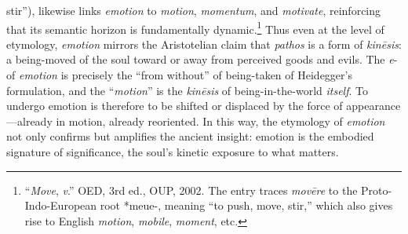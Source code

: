 \documentclass{article}
\begin{document}
stir”), likewise links \textit{emotion} to \textit{motion}, \textit{momentum}, and \textit{motivate}, reinforcing that its semantic horizon is fundamentally dynamic.\footnote{“\textit{Move}, \textit{v}.” OED, 3rd ed., OUP, 2002. The entry traces \textit{movēre} to the Proto-Indo-European root *meue-, meaning “to push, move, stir,” which also gives rise to English \textit{motion}, \textit{mobile}, \textit{moment}, etc.}  Thus even at the level of etymology, \textit{emotion} mirrors the Aristotelian claim that \textit{pathos} is a form of \textit{kinēsis}: a being-moved of the soul toward or away from perceived goods and evils. The \textit{e}- of \textit{emotion} is precisely the ``from without'' of being-taken of Heidegger's formulation, and the ``\textit{motion}'' is the \textit{kinēsis} of being-in-the-world \textit{itself}. To undergo emotion is therefore to be shifted or displaced by the force of appearance—already in motion, already reoriented. In this way, the etymology of \textit{emotion} not only confirms but amplifies the ancient insight: emotion is the embodied signature of significance, the soul’s kinetic exposure to what matters. 
\end{document}
